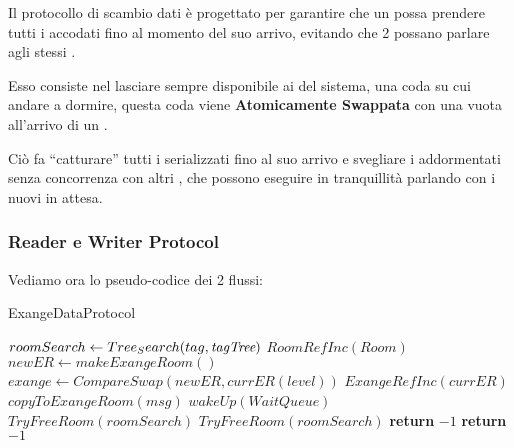 Il protocollo di scambio dati è progettato per garantire che un \Writer possa prendere tutti i \Reader accodati fino al
momento del suo arrivo, evitando che 2 \Writer possano parlare agli stessi \Reader.

Esso consiste nel lasciare sempre disponibile ai \Reader del sistema, una coda su cui andare a dormire, questa coda
viene \textbf{Atomicamente Swappata}  con una vuota all'arrivo di un \Writer.

Ciò fa ``catturare'' tutti i \Reader serializzati fino al suo arrivo e svegliare i \Reader addormentati senza
concorrenza con altri \Writer, che possono eseguire in tranquillità parlando con i nuovi \Reader in attesa.

\Writer

\subsubsection{Reader e Writer Protocol}
Vediamo ora lo pseudo-codice dei 2 flussi:

\begin{algorithm}
\caption{\Writer ExangeDataProtocol}\label{writeExange}
\begin{algorithmic}[1]
\State $roomSearch \gets Tree_Search(tag, \textit{tagTree})$
    \State $RoomRefInc(Room)$
        \State $newER \gets makeExangeRoom()$
        \State $exange \gets CompareSwap(newER, currER(level))$
        \State $ExangeRefInc(currER)$
        \State $copyToExangeRoom(msg)$
        \State $wakeUp(WaitQueue)$
        \State $TryFreeRoom(roomSearch)$
    \Else
        \State $TryFreeRoom(roomSearch)$
        \State \textbf{return} $-1$
    \EndIf
\Else
    \State \textbf{return} $-1$

\EndIf
\EndProcedure
\end{algorithmic}
\end{algorithm}


